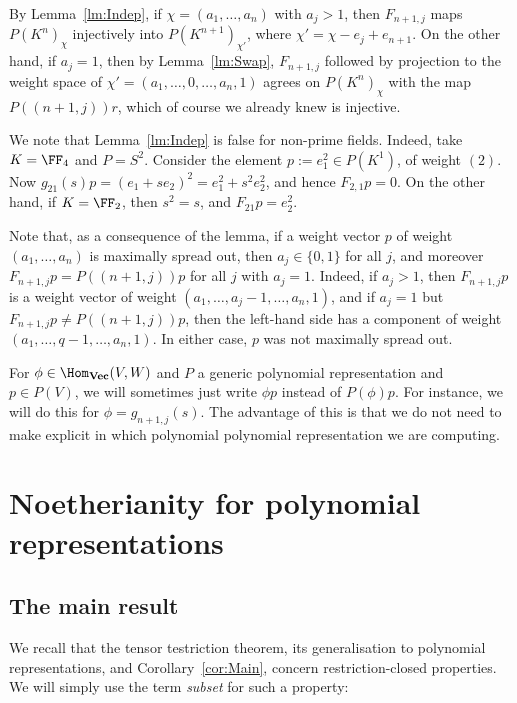 \documentclass{amsart}
\renewcommand{\Vec}{\mathbf{Vec}}
\begin{document}
By Lemma~\ref{lm:Indep}, if $\chi=(a_1,\ldots,a_n)$ with $a_j>1$, then
$F_{n+1,j}$ maps $P(K^n)_\chi$ injectively into $P(K^{n+1})_{\chi'}$,
where $\chi'=\chi-e_j+e_{n+1}$. On the other hand, if $a_j=1$, then by
Lemma~\ref{lm:Swap}, $F_{n+1,j}$ followed by projection to the weight
space of $\chi'=(a_1,\ldots,0,\ldots,a_n,1)$ agrees on $P(K^n)_\chi$
with the map $P((n+1,j))r$, which of course we already knew is injective.

\begin{ex}
We note that Lemma~\ref{lm:Indep} is false for non-prime fields. Indeed,
take $K=\FF_4$ and $P=S^2$. Consider the element $p:=e_1^2 \in P(K^1)$,
of weight $(2)$. Now $g_{21}(s)p=(e_1+s e_2)^2=e_1^2 + s^2 e_2^2$,
and hence $F_{2,1}p=0$. On the other hand, if $K=\FF_2$, then $s^2=s$,
and $F_{21}p=e_2^2$.
\end{ex}

\begin{re} \label{re:SpreadOut}
Note that, as a consequence of the lemma, if a weight vector $p$
of weight $(a_1,\ldots,a_n)$ is maximally spread out, then $a_j \in
\{0,1\}$ for all $j$, and moreover $F_{n+1,j}p=P((n+1,j))p$ for all
$j$ with $a_j=1$. Indeed, if $a_j>1$, then $F_{n+1,j} p$ is a weight
vector of weight $(a_1,\ldots,a_j-1,\ldots,a_n,1)$, and if $a_j=1$ but
$F_{n+1,j}p \neq P((n+1,j))p$, then the left-hand side has a component
of weight $(a_1,\ldots,q-1,\ldots,a_n,1)$. In either case, $p$ was not
maximally spread out.
\end{re}

\begin{re}
For $\phi \in \Hom_\Vec(V,W)$ and $P$ a generic
polynomial representation and $p \in P(V)$, we will sometimes just write
$\phi p$ instead of $P(\phi)p$. For instance, we will do this for
$\phi=g_{n+1,j}(s)$. The advantage of this is that we do not need to make
explicit in which polynomial polynomial representation we are computing.
\end{re}

\section{Noetherianity for polynomial representations}
\label{sec:Noetherianity}

\subsection{The main result}

We recall that the tensor testriction theorem, its generalisation to
polynomial representations, and Corollary~\ref{cor:Main}, concern
restriction-closed properties. We will simply use the term
{\em subset} for such a property:
\end{document}
